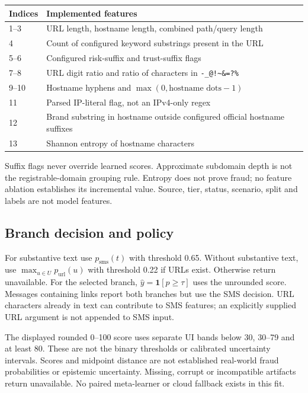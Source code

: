 \documentclass[11pt]{article}
\begin{document}
\begin{center}
\small
\begin{tabularx}{\linewidth}{lX}
\toprule
Indices & Implemented features\\
\midrule
1--3 & URL length, hostname length, combined path/query length\\
4 & Count of configured keyword substrings present in the URL\\
5--6 & Configured risk-suffix and trust-suffix flags\\
7--8 & URL digit ratio and ratio of characters in \texttt{-\_@!\textasciitilde\&=?\%}\\
9--10 & Hostname hyphens and $\max(0,\text{hostname dots}-1)$\\
11 & Parsed IP-literal flag, not an IPv4-only regex\\
12 & Brand substring in hostname outside configured official hostname suffixes\\
13 & Shannon entropy of hostname characters\\
\bottomrule
\end{tabularx}
\end{center}

Suffix flags never override learned scores. Approximate subdomain depth is not the
registrable-domain grouping rule. Entropy does not prove fraud; no feature ablation
establishes its incremental value. Source, tier, status, scenario, split and labels
are not model features.

\subsection{Branch decision and policy}
For substantive text use $p_{\mathrm{sms}}(t)$ with threshold 0.65. Without
substantive text, use $\max_{u\in U}p_{\mathrm{url}}(u)$ with threshold 0.22 if
URLs exist. Otherwise return unavailable. For the selected branch,
$\hat y=\mathbf{1}[p\geq\tau]$ uses the unrounded score.
Messages containing links report both branches but use the SMS decision.
URL characters already in text can contribute to SMS features; an explicitly
supplied URL argument is not appended to SMS input.

The displayed rounded 0--100 score uses separate UI bands below 30, 30--79 and
at least 80. These are not the binary thresholds or calibrated uncertainty
intervals. Scores and midpoint distance are not established real-world fraud
probabilities or epistemic uncertainty. Missing, corrupt or incompatible artifacts
return unavailable. No paired meta-learner or cloud fallback exists in this fit.
\end{document}
